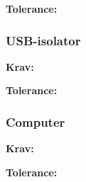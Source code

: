 \textbf{Tolerance:}
\begin{itemize}
\end{itemize}

\subsubsection{USB-isolator}
\textbf{Krav:}
\begin{itemize}

\end{itemize}

\textbf{Tolerance:}
\begin{itemize}
\end{itemize}

\subsubsection{Computer}
\textbf{Krav:}
\begin{itemize}

\end{itemize}

\textbf{Tolerance:}
\begin{itemize}
\end{itemize}




